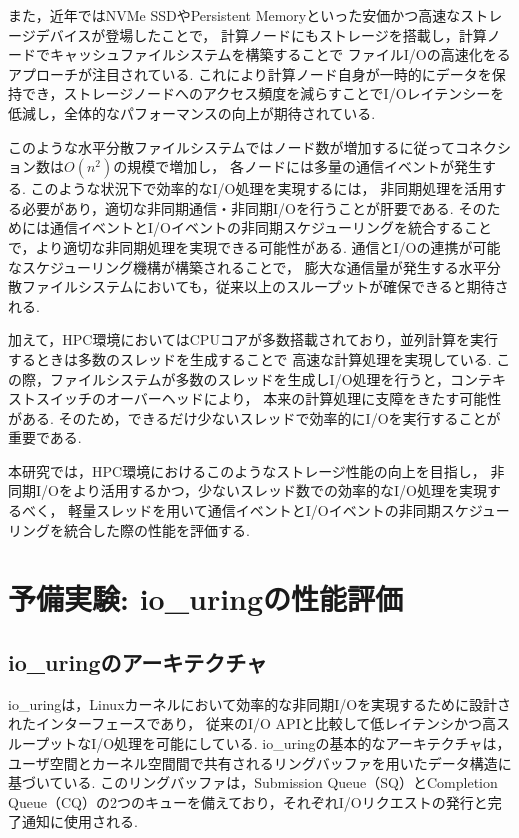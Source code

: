 \documentclass[a4paper,11pt,openany]{jreport}
\begin{document}
また，近年ではNVMe SSDやPersistent Memoryといった安価かつ高速なストレージデバイスが登場したことで，
計算ノードにもストレージを搭載し，計算ノードでキャッシュファイルシステムを構築することで
ファイルI/Oの高速化をるアプローチが注目されている\cite{chfs}\cite{gekkofs}.
これにより計算ノード自身が一時的にデータを保持でき，ストレージノードへのアクセス頻度を減らすことでI/Oレイテンシーを低減し，全体的なパフォーマンスの向上が期待されている.

このような水平分散ファイルシステムではノード数が増加するに従ってコネクション数は$O(n^2)$の規模で増加し，
各ノードには多量の通信イベントが発生する. このような状況下で効率的なI/O処理を実現するには，
非同期処理を活用する必要があり，適切な非同期通信・非同期I/Oを行うことが肝要である.
そのためには通信イベントとI/Oイベントの非同期スケジューリングを統合することで，より適切な非同期処理を実現できる可能性がある.
通信とI/Oの連携が可能なスケジューリング機構が構築されることで，
膨大な通信量が発生する水平分散ファイルシステムにおいても，従来以上のスループットが確保できると期待される.

加えて，HPC環境においてはCPUコアが多数搭載されており，並列計算を実行するときは多数のスレッドを生成することで
高速な計算処理を実現している.
この際，ファイルシステムが多数のスレッドを生成しI/O処理を行うと，コンテキストスイッチのオーバーヘッドにより，
本来の計算処理に支障をきたす可能性がある.
そのため，できるだけ少ないスレッドで効率的にI/Oを実行することが重要である.

本研究では，HPC環境におけるこのようなストレージ性能の向上を目指し，
非同期I/Oをより活用するかつ，少ないスレッド数での効率的なI/O処理を実現するべく，
軽量スレッドを用いて通信イベントとI/Oイベントの非同期スケジューリングを統合した際の性能を評価する.

\chapter{予備実験: io\_uringの性能評価}
\section{io\_uringのアーキテクチャ}
io\_uringは，Linuxカーネルにおいて効率的な非同期I/Oを実現するために設計されたインターフェースであり，
従来のI/O APIと比較して低レイテンシかつ高スループットなI/O処理を可能にしている.
io\_uringの基本的なアーキテクチャは，ユーザ空間とカーネル空間間で共有されるリングバッファを用いたデータ構造に基づいている.
このリングバッファは，Submission Queue（SQ）とCompletion Queue（CQ）の2つのキューを備えており，それぞれI/Oリクエストの発行と完了通知に使用される.
\end{document}
